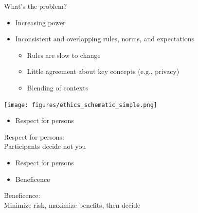 \documentclass{beamer}
\begin{document}
\begin{frame}

What's the problem?
\begin{itemize}
\item Increasing power
\pause
\item Inconsistent and overlapping rules, norms, and expectations
\pause
\begin{itemize}
\item Rules are slow to change
\pause
\item Little agreement about key concepts (e.g., privacy)
\pause
\item Blending of contexts
\end{itemize}
\end{itemize}

\end{frame}
\begin{frame}

\begin{center}
\texttt{[image: figures/ethics\_schematic\_simple.png]}
\end{center}

\end{frame}
\begin{frame}

\begin{itemize}
\item Respect for persons
\end{itemize}

\end{frame}
\begin{frame}

Respect for persons:\\
Participants decide not you

\end{frame}
\begin{frame}

\begin{itemize}
\item Respect for persons
\item Beneficence
\end{itemize}

\end{frame}
\begin{frame}

Beneficence:\\
Minimize risk, maximize benefits, then decide

\end{frame}
\end{document}
